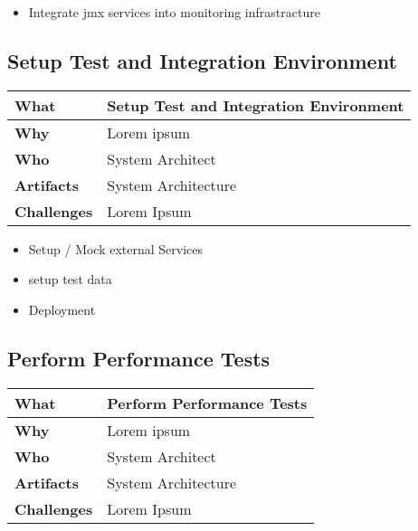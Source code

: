 \begin{itemize}
	\item Integrate jmx services into monitoring infrastracture
\end{itemize}

\subsection{Setup Test and Integration Environment}
\begin{minipage}{\textwidth}
 \label{table:ch6_Task_Setup_Test_Environment}
\begin{tabular}
	{|m{3cm}|m{10cm}|} \hline \bfseries What & Setup Test and Integration Environment\\
	\hline \bfseries Why & Lorem ipsum\\
	\hline \bfseries Who & System Architect\\
	\hline \bfseries Artifacts & System Architecture\\
	\hline \bfseries Challenges & Lorem Ipsum\\
	\hline 
\end{tabular}
\end{minipage}

\begin{itemize}
	\item Setup / Mock external Services
	\item setup test data
	\item Deployment
\end{itemize}

\subsection{Perform Performance Tests}
\begin{minipage}{\textwidth}
 \label{table:ch6_Task_Perform_Performance_Tests}
\begin{tabular}
	{|m{3cm}|m{10cm}|} \hline \bfseries What & Perform Performance Tests\\
	\hline \bfseries Why & Lorem ipsum\\
	\hline \bfseries Who & System Architect\\
	\hline \bfseries Artifacts & System Architecture\\
	\hline \bfseries Challenges & Lorem Ipsum\\
	\hline 
\end{tabular}
\end{minipage}

